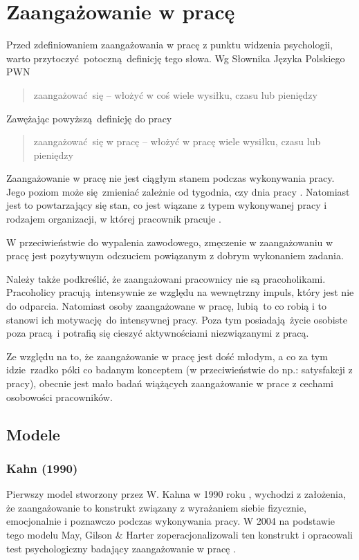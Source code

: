 \section{Zaangażowanie w pracę}
Przed zdefiniowaniem zaangażowania w pracę z punktu widzenia psychologii, warto przytoczyć potoczną definicję tego słowa. Wg Słownika Języka Polskiego PWN \citep{web:pwn-eng}
\begin{quote}
zaangażować się -- włożyć w coś wiele wysiłku, czasu lub pieniędzy
\end{quote}
Zawężając powyższą definicję do pracy
\begin{quote}
zaangażować się w pracę -- włożyć w pracę wiele wysiłku, czasu lub pieniędzy
\end{quote}

Zaangażowanie w pracę nie jest ciągłym stanem podczas wykonywania pracy. Jego poziom może się zmieniać zależnie od tygodnia, czy dnia pracy \citep{bakker2010weekly}. Natomiast jest to powtarzający się stan, co jest wiązane z typem wykonywanej pracy i rodzajem organizacji, w której pracownik pracuje \citep{macey2008meaning}.

W przeciwieństwie do wypalenia zawodowego, zmęczenie w zaangażowaniu w pracę jest pozytywnym odczuciem powiązanym z dobrym wykonaniem zadania.

Należy także podkreślić, że zaangażowani pracownicy nie są pracoholikami. Pracoholicy pracują intensywnie ze względu na wewnętrzny impuls, który jest nie do odparcia. Natomiast osoby zaangażowane w pracę, lubią to co robią i to stanowi ich motywację do intensywnej pracy. Poza tym posiadają życie osobiste poza pracą i potrafią się cieszyć aktywnościami niezwiązanymi z pracą.

Ze względu na to, że zaangażowanie w pracę jest dość młodym, a co za tym idzie rzadko póki co badanym konceptem (w przeciwieństwie do np.: satysfakcji z pracy), obecnie jest mało badań wiążących zaangażowanie w prace z cechami osobowości pracowników.
\subsection{Modele}
\subsubsection{Kahn (1990)}
Pierwszy model stworzony przez W. Kahna w 1990  roku \citep{kahn1990psychological}, wychodzi z założenia, że zaangażowanie to konstrukt związany z wyrażaniem siebie fizycznie, emocjonalnie i poznawczo podczas wykonywania pracy. W 2004 na podstawie tego modelu May, Gilson \& Harter zoperacjonalizowali ten konstrukt i opracowali test psychologiczny badający zaangażowanie w pracę \citep{may2004psychological}.

